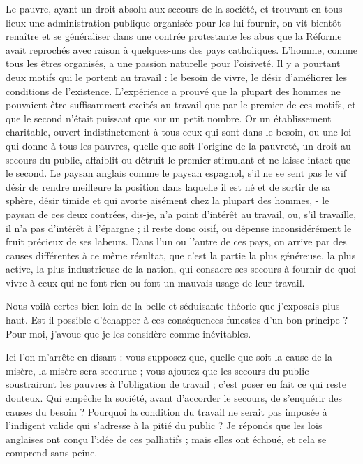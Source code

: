 \documentclass[french,twoside]{book} %
\begin{document}
Le pauvre, ayant un droit absolu aux secours de la société, et trouvant en tous lieux une administration publique organisée pour les lui fournir, on vit bientôt renaître et se généraliser dans une contrée protestante les abus que la Réforme avait reprochés avec raison à quelques-uns des pays catholiques. L'homme, comme tous les êtres organisés, a une passion naturelle pour l’oisiveté. Il y a pourtant deux motifs qui le portent au travail : le besoin de vivre, le désir d’améliorer les conditions de l’existence. L’expérience a prouvé que la plupart des hommes ne pouvaient être suffisamment excités au travail que par le premier de ces motifs, et que le second n’était puissant que sur un petit nombre. Or un établissement charitable, ouvert indistinctement à tous ceux qui sont dans le besoin, ou une loi qui donne à tous les pauvres, quelle que soit l’origine de la pauvreté, un droit au secours du public, affaiblit ou détruit le premier stimulant et ne laisse intact que le second. Le paysan anglais comme le paysan espagnol, s’il ne se sent pas le vif désir de rendre meilleure la position dans laquelle il est né et de sortir de sa sphère, désir timide et qui avorte aisément chez la plupart des hommes, - le paysan de ces deux contrées, dis-je, n’a point d’intérêt au travail, ou, s’il travaille, il n’a pas d’intérêt à l’épargne ; il reste donc oisif, ou dépense inconsidérément le fruit précieux de ses labeurs. Dans l’un ou l’autre de ces pays, on arrive par des causes différentes à ce même résultat, que c’est la partie la plus généreuse, la plus active, la plus industrieuse de la nation, qui consacre ses secours à fournir de quoi vivre à ceux qui ne font rien ou font un mauvais usage de leur travail.\par
Nous voilà certes bien loin de la belle et séduisante théorie que j’exposais plus haut. Est-il possible d’échapper à ces conséquences funestes d’un bon principe ? Pour moi, j’avoue que je les considère comme inévitables.\par
Ici l’on m’arrête en disant : vous supposez que, quelle que soit la cause de la misère, la misère sera secourue ; vous ajoutez que les secours du public soustrairont les pauvres à l’obligation de travail ; c’est poser en fait ce qui reste douteux. Qui empêche la société, avant d’accorder le secours, de s’enquérir des causes du besoin ? Pourquoi la condition du travail ne serait pas imposée à l’indigent valide qui s’adresse à la pitié du public ? Je réponds que les lois anglaises ont conçu l’idée de ces palliatifs ; mais elles ont échoué, et cela se comprend sans peine.\par
\end{document}

